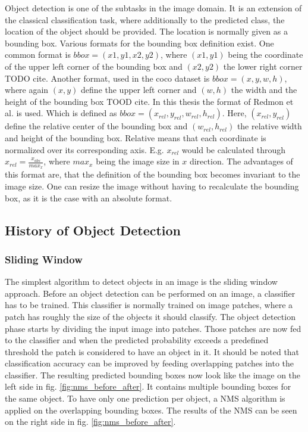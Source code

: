 Object detection is one of the subtasks in the image domain.
It is an extension of the classical classification task, where additionally to the predicted class, the location of the object should be provided.
The location is normally given as a bounding box.
Various formats for the bounding box definition exist.
One common format is $bbox = (x1, y1, x2, y2)$, where $(x1, y1)$ being the coordinate of the upper left corner of the bounding box and $(x2, y2)$ the lower right corner TODO cite.
Another format, used in the coco dataset is $bbox = (x, y, w, h)$, where again $(x, y)$ define the upper left corner and $(w, h)$ the width and the height of the bounding box TOOD cite.
In this thesis the format of Redmon et al. \cite{yolov1} is used.
Which is defined as $bbox = (x_{rel}, y_{rel}, w_{rel}, h_{rel})$.
Here, $(x_{rel}, y_{rel})$ define the relative center of the bounding box and $(w_{rel}, h_{rel})$ the relative width and height of the bounding box.
Relative means that each coordinate is normalized over its corresponding axis.
E.g. $x_{rel}$ would be calculated through $x_{rel} = \frac{x_{abs}}{max_x}$, where $max_x$ being the image size in $x$ direction.
The advantages of this format are, that the definition of the bounding box becomes invariant to the image size.
One can resize the image without having to recalculate the bounding box, as it is the case with an absolute format.

\subsection{History of Object Detection}

\subsubsection{Sliding Window}
The simplest algorithm to detect objects in an image is the sliding window approach.
Before an object detection can be performed on an image, a classifier has to be trained.
This classifier is normally trained on image patches, where a patch has roughly the size of the objects it should classify.
The object detection phase starts by dividing the input image into patches.
Those patches are now fed to the classifier and when the predicted probability exceeds a predefined threshold the patch is considered to have an object in it.
It should be noted that classification accuracy can be improved by feeding overlapping patches into the classifier.
The resulting predicted bounding boxes now look like the image on the left side in fig. \ref{fig:nms_before_after}.
It contains multiple bounding boxes for the same object.
To have only one prediction per object, a \ac{NMS} algorithm is applied on the overlapping bounding boxes.
The results of the \ac{NMS} can be seen on the right side in fig. \ref{fig:nms_before_after}.

